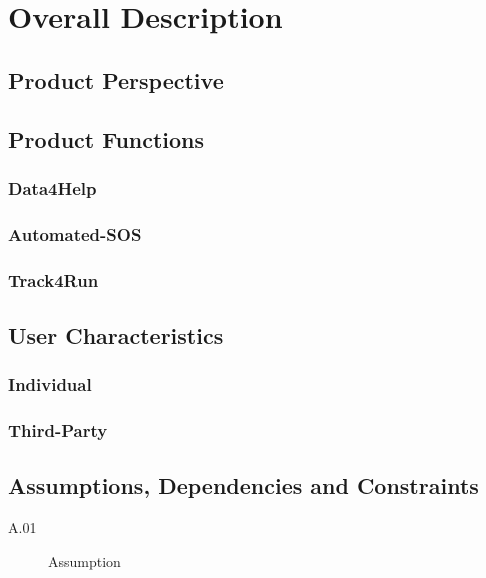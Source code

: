 \documentclass[a4paper]{article}
\begin{document}
\section{Overall Description}

    \subsection{Product Perspective}
    
    \subsection{Product Functions}
    
        \subsubsection{Data4Help}
        
        \subsubsection{Automated-SOS}
        
        \subsubsection{Track4Run}
    
    \subsection{User Characteristics}
    
        \subsubsection{Individual}
        
        \subsubsection{Third-Party}
        
    \subsection{Assumptions, Dependencies and Constraints}
        \begin{description}
            \item[A.01] Assumption
        \end{description}
        
\end{document}
